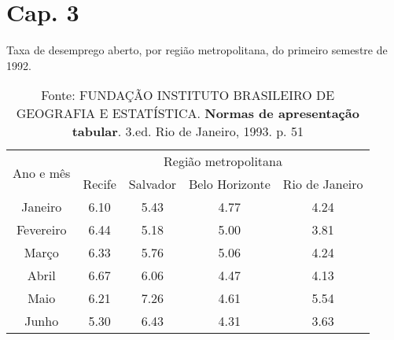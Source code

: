 \chapter{Cap. 3}

\lipsum[1]

\begin{table}[h]
\centering
\caption{Taxa de desemprego aberto, por região metropolitana, do primeiro semestre de 1992.}
\begin{tabular}{|c|c|c|c|c|}
\hline
\multirow{2}{*}{Ano e mês} & \multicolumn{4}{|c|}{Região metropolitana}          \\ \cline{2-5} 
                           & Recife & Salvador & Belo Horizonte & Rio de Janeiro \\ \hline
Janeiro                    & 6.10   & 5.43     & 4.77           & 4.24           \\ \hline
Fevereiro                  & 6.44   & 5.18     & 5.00           & 3.81           \\ \hline
Março                      & 6.33   & 5.76     & 5.06           & 4.24           \\ \hline
Abril                      & 6.67   & 6.06     & 4.47           & 4.13           \\ \hline
Maio                       & 6.21   & 7.26     & 4.61           & 5.54           \\ \hline
Junho                      & 5.30   & 6.43     & 4.31           & 3.63           \\ \hline
\end{tabular}
\caption*{Fonte: FUNDAÇÃO INSTITUTO BRASILEIRO DE GEOGRAFIA E ESTATÍSTICA. \textbf{Normas de apresentação tabular}. 3.ed. Rio de Janeiro, 1993. p. 51}
\end{table}

\lipsum[1]